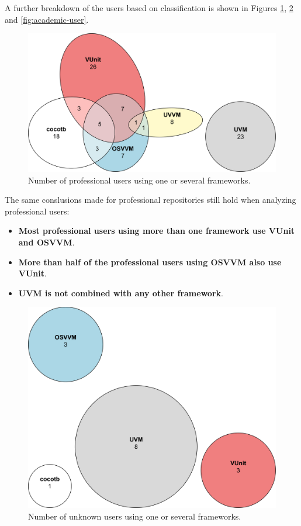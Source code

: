 \documentclass[]{article}
\providecommand{\tightlist}{%
  \setlength{\itemsep}{0pt}\setlength{\parskip}{0pt}}
\begin{document}
A further breakdown of the users based on classification is shown in Figures \ref{fig:professional-user}, \ref{fig:unknown-user} and \ref{fig:academic-user}.

\begin{figure}

{\centering \includegraphics[width=0.75\linewidth]{img/professional_user} 

}

\caption{Number of professional users using one or several frameworks.}\label{fig:professional-user}
\end{figure}

The same conslusions made for professional repositories still hold when analyzing professional users:

\begin{itemize}
\tightlist
\item
  \textbf{Most professional users using more than one framework use VUnit and OSVVM}.
\item
  \textbf{More than half of the professional users using OSVVM also use VUnit}.
\item
  \textbf{UVM is not combined with any other framework}.
\end{itemize}

\begin{figure}

{\centering \includegraphics[width=0.75\linewidth]{img/unknown_user} 

}

\caption{Number of unknown users using one or several frameworks.}\label{fig:unknown-user}
\end{figure}
\end{document}
